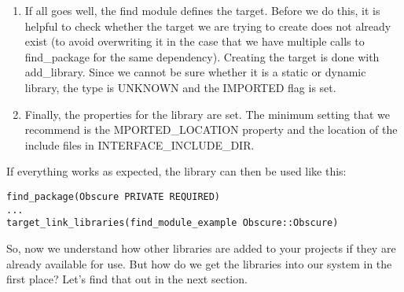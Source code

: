 \begin{enumerate}
\item 
If all goes well, the find module defines the target. Before we do this, it is helpful to check whether the target we are trying to create does not already exist (to avoid overwriting it in the case that we have multiple calls to find\_package for the same dependency). Creating the target is done with add\_library. Since we cannot be sure whether it is a static or dynamic library, the type is UNKNOWN and the IMPORTED flag is set.

\item 
Finally, the properties for the library are set. The minimum setting that we recommend is the MPORTED\_LOCATION property and the location of the include files in INTERFACE\_INCLUDE\_DIR.
\end{enumerate}

If everything works as expected, the library can then be used like this:

\begin{lstlisting}[style=styleCMake]
find_package(Obscure PRIVATE REQUIRED)
...
target_link_libraries(find_module_example Obscure::Obscure)
\end{lstlisting}

So, now we understand how other libraries are added to your projects if they are already available for use. But how do we get the libraries into our system in the first place? Let's find that out in the next section.

